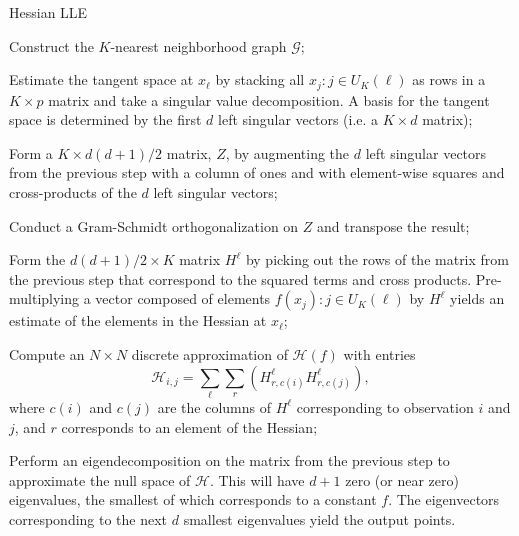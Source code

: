 \documentclass{article}
\begin{document}
\begin{algorithm}[!htb]
  \caption{Hessian LLE}
  \label{alg:hlle}
  \DontPrintSemicolon
  \SetAlgoLined
  \BlankLine
  \begin{algorithmic}[1]

  \STATE Construct the $K$-nearest neighborhood graph $\mathcal{G}$;


  \STATE Estimate the tangent space at $x_\ell$ by stacking all $x_j:j\in U_K(\ell)$ as rows in a $K\times p$ matrix and take a singular value decomposition. A basis for the tangent space is determined by the first $d$ left singular vectors (i.e. a $K\times d$ matrix);

  \STATE Form a $K\times d(d+1)/2$ matrix, $Z$, by augmenting the $d$ left singular vectors from the previous step with a column of ones and with element-wise squares and cross-products of the $d$ left singular vectors;

  \STATE Conduct a Gram-Schmidt orthogonalization on $Z$ and transpose the result;

  \STATE Form the $d(d+1)/2\times K$ matrix $H^\ell$ by picking out the rows of the matrix from the previous step that correspond to the squared terms and cross products. Pre-multiplying a vector composed of elements $f(x_j):j\in U_K(\ell)$ by $H^\ell$ yields an estimate of the elements in the Hessian at $x_\ell$;

  \ENDFOR

  \STATE Compute an $N\times N$ discrete approximation of $\mathcal{H}(f)$ with entries
  $$
    \mathcal{H}_{i,j} = \sum_\ell \sum_r (H^\ell_{r,c(i)} H^\ell_{r,c(j)}),
  $$
  where $c(i)$ and $c(j)$ are the columns of $H^\ell$ corresponding to observation $i$ and $j$, and $r$ corresponds to an element of the Hessian;

  \STATE  Perform an eigendecomposition on the matrix from the previous step to approximate the null space of $\mathcal{H}$. This will have $d+1$ zero (or near zero) eigenvalues, the smallest of which corresponds to a constant $f$. The eigenvectors corresponding to the next $d$ smallest eigenvalues yield the output points.

  \end{algorithmic}
\end{algorithm}
\end{document}
